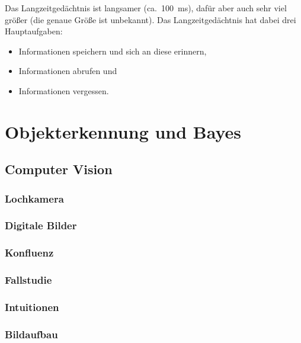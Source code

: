\documentclass[a4paper, 11pt, accentcolor = tud3b]{tudreport}
\newcommand{\ca}{ca.~}
\begin{document}
				Das Langzeitgedächtnis ist langsamer (\ca \SI{100}{\milli\second}), dafür aber auch sehr viel größer (die genaue Größe ist unbekannt). Das Langzeitgedächtnis hat dabei drei Hauptaufgaben:
				\begin{itemize}
					\item Informationen speichern und sich an diese erinnern,
					\item Informationen abrufen und
					\item Informationen vergessen.
				\end{itemize}

	\chapter{Objekterkennung und Bayes} %

		\section{Computer Vision} %

			\subsection{Lochkamera} %

			\subsection{Digitale Bilder} %

			\subsection{Konfluenz} %

			\subsection{Fallstudie} %

			\subsection{Intuitionen} %

			\subsection{Bildaufbau} %
\end{document}
